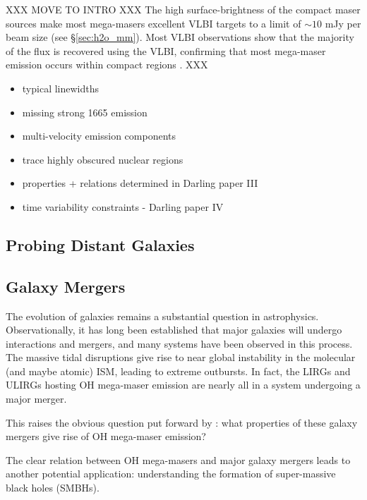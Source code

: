 XXX MOVE TO INTRO XXX
The high surface-brightness of the compact maser sources make most mega-masers excellent VLBI targets to a limit of $\sim 10$ mJy per beam size (see \S\ref{sec:h2o_mm}). Most VLBI observations show that the majority of the flux is recovered using the VLBI, confirming that most mega-maser emission occurs within compact regions \citep{lo2005}. XXX


\begin{itemize}
\item typical linewidths 
\item missing strong 1665 emission
\item multi-velocity emission components
\item trace highly obscured nuclear regions
\item properties + relations determined in Darling paper III
\item time variability constraints - Darling paper IV
\end{itemize}

\subsection{Probing Distant Galaxies}
\label{sub:oh_distance}

\subsection{Galaxy Mergers}
\label{sub:oh_mergers}

The evolution of galaxies remains a substantial question in astrophysics. Observationally, it has long been established that major galaxies will undergo interactions and mergers, and many systems have been observed in this process. The massive tidal disruptions give rise to near global instability in the molecular (and maybe atomic) ISM, leading to extreme outbursts. In fact, the LIRGs and ULIRGs hosting OH mega-maser emission are nearly all in a system undergoing a major merger. 

This raises the obvious question put forward by \citet{lo2005}: what properties of these galaxy mergers give rise of OH mega-maser emission?


The clear relation between OH mega-masers and major galaxy mergers leads to another potential application: understanding the formation of super-massive black holes (SMBHs). 

